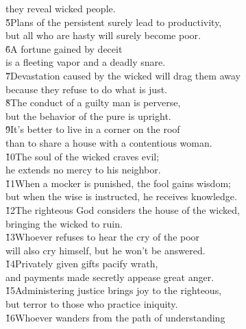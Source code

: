 \begin{poetry}
\poemll    they reveal wicked people. \\
\poeml \v{5}Plans of the persistent surely lead to productivity, \\
\poemll    but all who are hasty will surely become poor. \\
\poeml \v{6}A fortune gained by deceit \\
\poemll    is a fleeting vapor and a deadly snare. \\
\poeml \v{7}Devastation caused by the wicked will drag them away \\
\poemll    because they refuse to do what is just. \\
\poeml \v{8}The conduct of a guilty man is perverse, \\
\poemll    but the behavior of the pure is upright. \\
\poeml \v{9}It's better to live in a corner on the roof \\
\poemll    than to share a house with a contentious woman. \\
\poeml \v{10}The soul of the wicked craves evil; \\
\poemll    he extends no mercy to his neighbor. \\
\poeml \v{11}When a mocker is punished, the fool gains wisdom; \\
\poemll    but when the wise is instructed, he receives knowledge. \\
\poeml \v{12}The righteous God considers the house of the wicked, \\
\poemll    bringing the wicked to ruin. \\
\poeml \v{13}Whoever refuses to hear the cry of the poor \\
\poemll    will also cry himself, but he won't be answered. \\
\poeml \v{14}Privately given gifts pacify wrath, \\
\poemll    and payments made secretly appease great anger. \\
\poeml \v{15}Administering justice brings joy to the righteous, \\
\poemll    but terror to those who practice iniquity. \\
\poeml \v{16}Whoever wanders from the path of understanding \\

\end{poetry}
